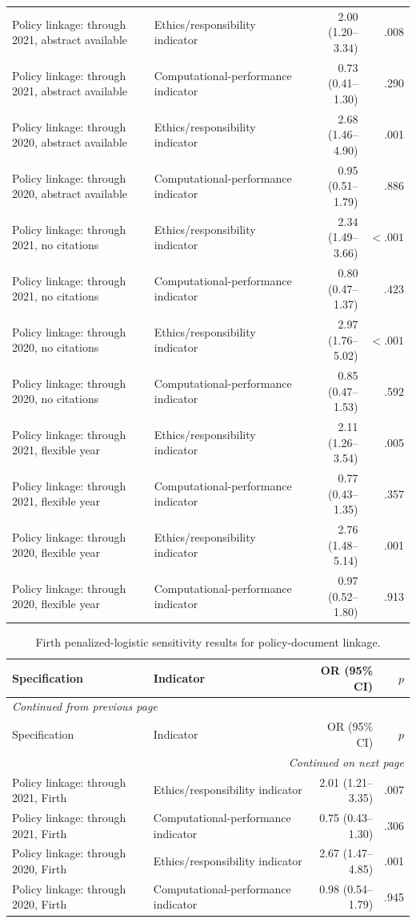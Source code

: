 \documentclass[11pt]{article}
\begin{document}
\begin{longtable}{p{5.0cm}p{4.0cm}rr}
Policy linkage: through 2021, abstract available & Ethics/responsibility indicator & 2.00 (1.20--3.34) & .008 \\
Policy linkage: through 2021, abstract available & Computational-performance indicator & 0.73 (0.41--1.30) & .290 \\
Policy linkage: through 2020, abstract available & Ethics/responsibility indicator & 2.68 (1.46--4.90) & .001 \\
Policy linkage: through 2020, abstract available & Computational-performance indicator & 0.95 (0.51--1.79) & .886 \\
Policy linkage: through 2021, no citations & Ethics/responsibility indicator & 2.34 (1.49--3.66) & $<.001$ \\
Policy linkage: through 2021, no citations & Computational-performance indicator & 0.80 (0.47--1.37) & .423 \\
Policy linkage: through 2020, no citations & Ethics/responsibility indicator & 2.97 (1.76--5.02) & $<.001$ \\
Policy linkage: through 2020, no citations & Computational-performance indicator & 0.85 (0.47--1.53) & .592 \\
Policy linkage: through 2021, flexible year & Ethics/responsibility indicator & 2.11 (1.26--3.54) & .005 \\
Policy linkage: through 2021, flexible year & Computational-performance indicator & 0.77 (0.43--1.35) & .357 \\
Policy linkage: through 2020, flexible year & Ethics/responsibility indicator & 2.76 (1.48--5.14) & .001 \\
Policy linkage: through 2020, flexible year & Computational-performance indicator & 0.97 (0.52--1.80) & .913 \\
\end{longtable}

\begin{longtable}{p{4.5cm}p{4.0cm}rr}
\caption{Firth penalized-logistic sensitivity results for policy-document linkage.}\label{tab:s3-firth}\\
\toprule
Specification & Indicator & OR (95\% CI) & $p$ \\
\midrule
\endfirsthead
\multicolumn{4}{l}{\small\itshape Continued from previous page} \\
\toprule
Specification & Indicator & OR (95\% CI) & $p$ \\
\midrule
\endhead
\midrule
\multicolumn{4}{r}{\small\itshape Continued on next page} \\
\endfoot
\bottomrule
\endlastfoot
Policy linkage: through 2021, Firth & Ethics/responsibility indicator & 2.01 (1.21--3.35) & .007 \\
Policy linkage: through 2021, Firth & Computational-performance indicator & 0.75 (0.43--1.30) & .306 \\
Policy linkage: through 2020, Firth & Ethics/responsibility indicator & 2.67 (1.47--4.85) & .001 \\
Policy linkage: through 2020, Firth & Computational-performance indicator & 0.98 (0.54--1.79) & .945 \\
\end{longtable}
\end{document}
